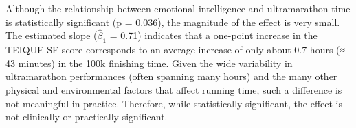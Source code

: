 \documentclass[
]{article}
\begin{document}
Although the relationship between emotional intelligence and
ultramarathon time is statistically significant (p = 0.036), the
magnitude of the effect is very small. The estimated slope
(\(\hat{\beta}_1\) = 0.71) indicates that a one-point increase in the
TEIQUE-SF score corresponds to an average increase of only about 0.7
hours (≈ 43 minutes) in the 100k finishing time. Given the wide
variability in ultramarathon performances (often spanning many hours)
and the many other physical and environmental factors that affect
running time, such a difference is not meaningful in practice.
Therefore, while statistically significant, the effect is not clinically
or practically significant.
\end{document}
